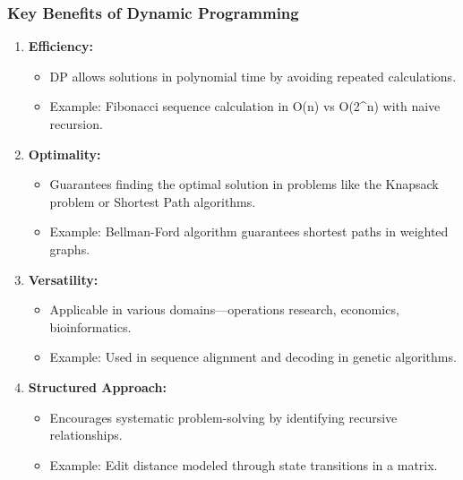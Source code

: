 \documentclass[aspectratio=169]{beamer}
\begin{document}
\begin{frame}[fragile]
    \frametitle{Key Benefits of Dynamic Programming}
    \begin{enumerate}
        \item \textbf{Efficiency:}
            \begin{itemize}
                \item DP allows solutions in polynomial time by avoiding repeated calculations.
                \item Example: Fibonacci sequence calculation in O(n) vs O(2^n) with naive recursion.
            \end{itemize}

        \item \textbf{Optimality:}
            \begin{itemize}
                \item Guarantees finding the optimal solution in problems like the Knapsack problem or Shortest Path algorithms.
                \item Example: Bellman-Ford algorithm guarantees shortest paths in weighted graphs.
            \end{itemize}

        \item \textbf{Versatility:}
            \begin{itemize}
                \item Applicable in various domains—operations research, economics, bioinformatics.
                \item Example: Used in sequence alignment and decoding in genetic algorithms.
            \end{itemize}

        \item \textbf{Structured Approach:}
            \begin{itemize}
                \item Encourages systematic problem-solving by identifying recursive relationships.
                \item Example: Edit distance modeled through state transitions in a matrix.
            \end{itemize}
    \end{enumerate}
\end{frame}
\end{document}
